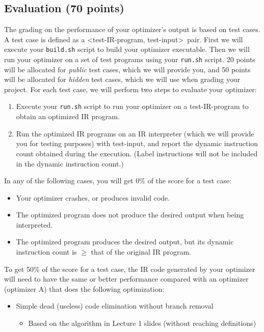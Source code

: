 \documentclass[12pt]{article}
\begin{document}
\subsection{Evaluation (70 points)}\label{sec:test}

The grading on the performance of your optimizer's output is based on test cases.
A test case is defined as a \textless test-IR-program, test-input\textgreater~pair.
First we will execute your \texttt{build.sh} script to build your optimizer executable.
Then we will run your optimizer on a set of test programs using your \texttt{run.sh} script.  20 points will
be allocated for {\em public} test cases, which we will provide you, and 50
points will be allocated for {\em hidden} test cases, which we will
use when grading your project.  For each test case, we will perform
two steps to evaluate your optimizer:
\begin{enumerate}
\item Execute your  \texttt{run.sh} script to run your optimizer on a test-IR-program to obtain an optimized IR program.
\item Run the optimized IR programs on an IR interpreter (which we will
  provide you for testing purposes) with test-input, and report the
  dynamic instruction count obtained during the execution.  (Label
  instructions will not be included in the dynamic instruction count.)
\end{enumerate}

In any of the following cases, you will get 0\% of the score for a test case:
\begin{itemize}
\item Your optimizer crashes, or produces invalid code.
\item The optimized program does not produce the desired output when
  being interpreted.
\item The optimized program produces the desired output, but its
  dynamic instruction count is $\geq$ that of the original IR program.
\end{itemize}

To get 50\% of the score for a test case, the IR code generated by your optimizer will need to have the same or better performance compared with an optimizer (optimizer A) that does the following optimization:
\begin{itemize}
\item Simple dead (useless) code elimination without branch removal
\begin{itemize}
\item Based on the algorithm in Lecture 1 slides (without reaching definitions)
\end{itemize}
\end{itemize}
\end{document}
